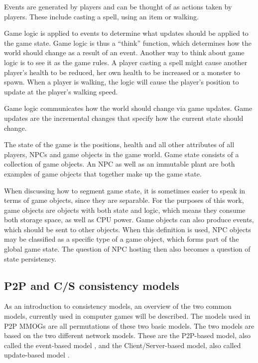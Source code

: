 \documentclass[journal,oneside,a4paper,onecolumn]{IEEEtran}
\begin{document}
\begin{description}
    \item[Events] Events are generated by players and can be thought of as actions taken by players. These include casting a spell, using an item or walking.
    \item[Game Logic] Game logic is applied to events to determine what updates should be applied to the game state. Game logic is thus a ``think'' function, which determines how the world should change as a result of an event. Another way to think about game logic is to see it as the game rules. A player casting a spell might cause another player's health to be reduced, her own health to be increased or a monster to spawn. When a player is walking, the logic will cause the player's position to update at the player's walking speed.
    \item[Update] Game logic communicates how the world should change via game updates. Game updates are the incremental changes that specify how the current state should change.
    \item[Game State] The state of the game is the positions, health and all other attributes of all players, NPCs and game objects in the game world. Game state consists of a collection of game objects. An NPC as well as an immutable plant are both examples of game objects that together make up the game state.
    \item[Game objects] When discussing how to segment game state, it is sometimes easier to speak in terms of game objects, since they are separable. For the purposes of this work, game objects are objects with both state and logic, which means they consume both storage space, as well as CPU power. Game objects can also produce events, which should be sent to other objects. When this definition is used, NPC objects may be classified as a specific type of a game object, which forms part of the global game state. The question of NPC hosting then also becomes a question of state persistency.
\end{description}



\subsection{P2P and C/S consistency models}
\label{classic_models}

As an introduction to consistency models, an overview of the two common models, currently used in computer games will be described. The models used in P2P MMOGs are all permutations of these two basic models. The two models are based on the two different network models. These are the P2P-based model, also called the event-based model \cite{p2p_cm_aoe}, and the Client/Server-based model, also called update-based model \cite{unreal_networking}.
\end{document}
